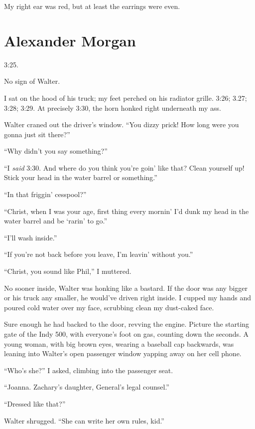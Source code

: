 My right ear was red, but at least the earrings were even.

\chapter{Alexander Morgan}

\titlemark

\hspace{\parindent}3:25.

No sign of Walter.

I sat on the hood of his truck; my feet perched on his radiator grille.
3:26; 3.27; 3:28; 3:29. At precisely 3:30, the horn honked right
underneath my ass.

Walter craned out the driver's window. ``You dizzy prick! How long were
you gonna just sit there?''

``Why didn't you say something?''

``I \emph{said} 3:30. And where do you think you're goin' like that?
Clean yourself up! Stick your head in the water barrel or something.''

``In that friggin' cesspool?''

``Christ, when I was your age, first thing every mornin' I'd dunk my
head in the water barrel and be `rarin' to go.''

``I'll wash inside.''

``If you're not back before you leave, I'm leavin' without you.''

``Christ, you sound like Phil,'' I muttered.

No sooner inside, Walter was honking like a bastard. If the door was any
bigger or his truck any smaller, he would've driven right inside. I
cupped my hands and poured cold water over my face, scrubbing clean my
dust-caked face.

Sure enough he had backed to the door, revving the engine. Picture the
starting gate of the Indy 500, with everyone's foot on gas, counting
down the seconds. A young woman, with big brown eyes, wearing a baseball
cap backwards, was leaning into Walter's open passenger window yapping
away on her cell phone.

``Who's she?'' I asked, climbing into the passenger seat.

``Joanna. Zachary's daughter, General's legal counsel.''

``Dressed like that?''

Walter shrugged. ``She can write her own rules, kid.''


